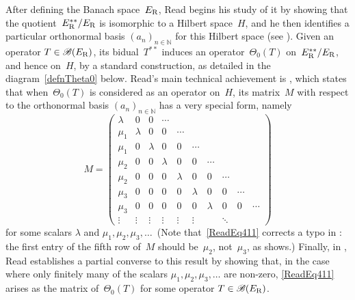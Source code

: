\documentclass[12pt,reqno]{amsart}
\theoremstyle{definition}
\numberwithin{equation}{section}
\newcommand{\N}{\mathbb{N}}
\begin{document}
After defining the Banach space~$E_{\normalfont{\text{R}}}$, Read
begins his study of it by showing that the
quotient~$E_{\normalfont{\text{R}}}^{**}/E_{\normalfont{\text{R}}}$ is
isomorphic to a Hilbert space~$H$, and he then identifies a particular
ortho\-normal basis $(a_n)_{n\in\N}$ for this Hilbert space (see
\cite[equation~(3.6.5) and Lemma~3.7]{read}).  Given an operator
\mbox{$T\in\mathscr{B}(E_{\normalfont{\text{R}}})$}, its
bidual~$T^{**}$ induces an operator~$\Theta_0(T)$
on~$E_{\normalfont{\text{R}}}^{**}/E_{\normalfont{\text{R}}}$, and
hence on~$H$, by a standard construction, as detailed in the
diagram~\eqref{defnTheta0} below. Read's main technical achievement is
\cite[Lemma~4.1]{read}, which states that when~$\Theta_0(T)$ is
considered as an operator on~$H$, its matrix~$M$ with respect to the
orthonormal basis $(a_n)_{n\in\N}$ has a very special form, namely
\begin{equation}\label{ReadEq411}
M = \begin{pmatrix} \lambda & 0 & 0 & \cdots\\
\mu_1 & \lambda & 0 & 0 & \cdots\\
\mu_1 & 0 & \lambda & 0 & 0 & \cdots\\
\mu_2 & 0 & 0 & \lambda & 0 & 0 & \cdots\\
\mu_2 & 0 & 0 & 0 & \lambda & 0 & 0 & \cdots\\
\mu_3 & 0 & 0 & 0 & 0 & \lambda & 0 & 0 & \cdots\\
\mu_3 & 0 & 0 & 0 & 0 & 0 & \lambda & 0 & 0 & \cdots\\
\vdots & \vdots & \vdots & \vdots & \vdots & \vdots & & \ddots
\end{pmatrix}
\end{equation}
for some scalars $\lambda$ and $\mu_1,\mu_2,\mu_3,\ldots$\, (Note
that~\eqref{ReadEq411} corrects a typo in
\cite[equation~(4.1.1)]{read}: the first entry of the fifth row of~$M$
should be~$\mu_2$, not~$\mu_3$, as \cite[Lemma~4.1(c)]{read} shows.)
Finally, in \cite[Lemma~4.2]{read}, Read establishes a partial
converse to this result by showing that, in the case where only
finitely many of the scalars $\mu_1,\mu_2,\mu_3,\ldots$ are non-zero,
\eqref{ReadEq411} arises as the matrix of~$\Theta_0(T)$ for some
operator $T\in\mathscr{B}(E_{\normalfont{\text{R}}})$.
\end{document}
